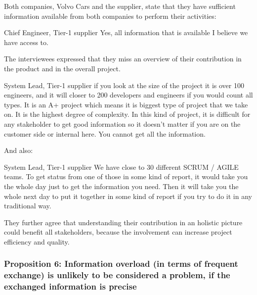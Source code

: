  Both companies, Volvo Cars and the supplier, state that they have sufficient information available from both companies to perform their activities:

\begin{aquote}{Chief Engineer, Tier-1 supplier}
Yes, all information that is available I believe we have access to.
\end{aquote}

 The interviewees expressed that they miss an overview of their contribution in the product and in the overall project. 

\begin{aquote}{System Lead, Tier-1 supplier}
if you look at the size of the project it is over 100 engineers, and it will closer to 200 developers and engineers if you would count all types. It is an A+ project which means it is biggest type of project that we take on. It is the highest degree of complexity. In this kind of project, it is difficult for any stakeholder to get good information so it doesn't matter if you are on the customer side or internal here. You cannot get all the information.
\end{aquote}

And also:

\begin{aquote}{System Lead, Tier-1 supplier}
We have close to 30 different SCRUM / AGILE teams. To get status from one of those in some kind of report, it would take you the whole day just to get the information you need. Then it will take you the whole next day to put it together in some kind of report if you try to do it in any traditional way. 
\end{aquote}

They further agree that understanding their contribution in an holistic picture could benefit all stakeholders, because the involvement can increase project efficiency and quality.




\vspace{.2cm}
\subsubsection{Proposition 6: Information overload (in terms of frequent exchange) is unlikely to be considered a problem, if the exchanged information is precise}

